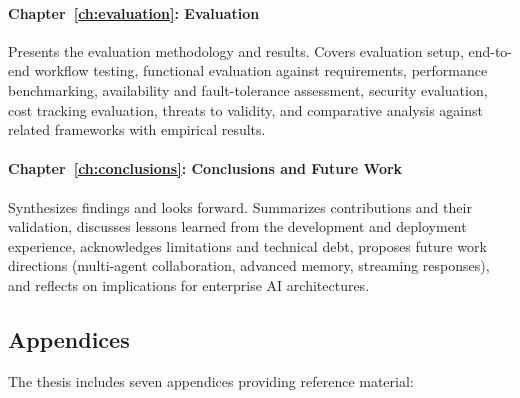 \paragraph{Chapter~\ref{ch:evaluation}: Evaluation}
Presents the evaluation methodology and results. Covers evaluation setup, end-to-end workflow testing, functional evaluation against requirements, performance benchmarking, availability and fault-tolerance assessment, security evaluation, cost tracking evaluation, threats to validity, and comparative analysis against related frameworks with empirical results.

\paragraph{Chapter~\ref{ch:conclusions}: Conclusions and Future Work}
Synthesizes findings and looks forward. Summarizes contributions and their validation, discusses lessons learned from the development and deployment experience, acknowledges limitations and technical debt, proposes future work directions (multi-agent collaboration, advanced memory, streaming responses), and reflects on implications for enterprise AI architectures.

\subsection{Appendices}

The thesis includes seven appendices providing reference material:

